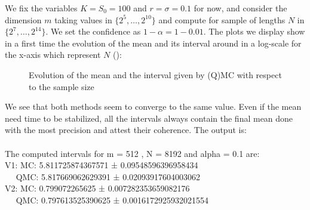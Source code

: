 \documentclass[a4paper]{article}
\theoremstyle{definition}
\theoremstyle{remark}
\newcommand{\s}{\sigma}
\begin{document}
We fix the variables $K=S_0=100$ and $r=\s=0.1$ for now, and consider the dimension $m$ taking values in $\{2^5,\dots,2^{10}\}$ and compute for sample of lengths $N$ in $\{2^7,\dots,2^{14}\}$. We set the confidence as $1-\alpha=1-0.01$.
The plots we display show in a first time the evolution of the mean and its interval around in a log-scale for the x-axis which represent $N$ ():
\begin{figure}[H] 
    \caption{Evolution of the mean and the interval given by (Q)MC with respect to the sample size}
    \label{fig:q1interval}
\end{figure}
We see that both methods seem to converge to the same value. Even if the mean need time to be stabilized, all the intervals always contain the final mean done with the most precision and attest their coherence.
The output is:
\\\\
The computed intervals for m = 512 , N = 8192 and alpha = 0.1 are:\\
V1:  MC: 5.811725874367571 ± 0.09548596396958434\\
$\quad$ QMC: 5.817669062629391 ± 0.02093917604003062\\
V2:  MC: 0.799072265625 ± 0.007282353659082176\\
$\quad$   QMC: 0.797613525390625 ± 0.0016172925932021554
\\\\
\end{document}
